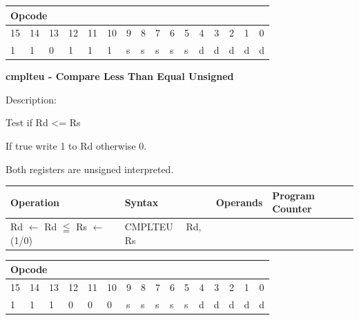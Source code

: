 \documentclass[%
	pdftex,
	a4paper,
	oneside,
	bibtotoc,%
	idxtotoc,%
	bibtotocnumbered,
	halfparskip,%
]{scrbook}
\begin{document}
\begin{tabular}{|c|c|c|c|c|c|c|c|c|c|c|c|c|c|c|c|}
\hline
\multicolumn{6}{|l|}{Opcode} & \multicolumn{5}{|l|}{} & \multicolumn{5}{|l|}{
} \\ \hline
15 & 14 & 13 & 12 & 11 & 10 & 9 & 8 & 7 & 6 & 5 & 4 & 3 & 2 & 1 & 0 \\ \hline
\multicolumn{1}{|l|}{1} & \multicolumn{1}{|l|}{1} & \multicolumn{1}{|l|}{0}
& \multicolumn{1}{|l|}{1} & \multicolumn{1}{|l|}{1} & \multicolumn{1}{|l|}{1}
& \multicolumn{1}{|l|}{s} & \multicolumn{1}{|l|}{s} & \multicolumn{1}{|l|}{s}
& \multicolumn{1}{|l|}{s} & \multicolumn{1}{|l|}{s} & \multicolumn{1}{|l|}{d}
& \multicolumn{1}{|l|}{d} & \multicolumn{1}{|l|}{d} & \multicolumn{1}{|l|}{d}
& \multicolumn{1}{|l|}{d} \\ \hline
\end{tabular}

\bigskip

\textbf{cmplteu - Compare Less Than Equal Unsigned}

Description:

Test if Rd <= Rs

If true write 1 to Rd otherwise 0.

Both registers are unsigned interpreted.

\begin{tabular}{|l|l|l|l|}
\hline
Operation & Syntax & Operands & Program Counter \\ \hline
Rd $\leftarrow $ Rd $\leqq $ Rs $\leftarrow $ (1/0) & CMPLTEU \ \ Rd, Rs & 
&  \\ \hline
\end{tabular}

\begin{tabular}{|c|c|c|c|c|c|c|c|c|c|c|c|c|c|c|c|}
\hline
\multicolumn{6}{|l|}{Opcode} & \multicolumn{5}{|l|}{} & \multicolumn{5}{|l|}{
} \\ \hline
15 & 14 & 13 & 12 & 11 & 10 & 9 & 8 & 7 & 6 & 5 & 4 & 3 & 2 & 1 & 0 \\ \hline
\multicolumn{1}{|l|}{1} & \multicolumn{1}{|l|}{1} & \multicolumn{1}{|l|}{1}
& \multicolumn{1}{|l|}{0} & \multicolumn{1}{|l|}{0} & \multicolumn{1}{|l|}{0}
& \multicolumn{1}{|l|}{s} & \multicolumn{1}{|l|}{s} & \multicolumn{1}{|l|}{s}
& \multicolumn{1}{|l|}{s} & \multicolumn{1}{|l|}{s} & \multicolumn{1}{|l|}{d}
& \multicolumn{1}{|l|}{d} & \multicolumn{1}{|l|}{d} & \multicolumn{1}{|l|}{d}
& \multicolumn{1}{|l|}{d} \\ \hline
\end{tabular}
\end{document}
